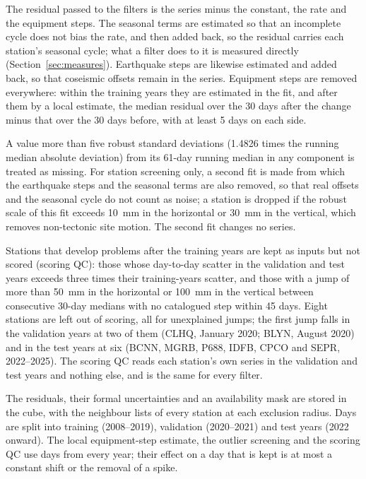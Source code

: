 \documentclass[preprint,12pt,authoryear]{elsarticle}
\begin{document}
The residual passed to the filters is the series minus the constant, the rate and the equipment steps. The seasonal terms are estimated so that an incomplete cycle does not bias the rate, and then added back, so the residual carries each station's seasonal cycle; what a filter does to it is measured directly (Section~\ref{sec:measures}). Earthquake steps are likewise estimated and added back, so that coseismic offsets remain in the series. Equipment steps are removed everywhere: within the training years they are estimated in the fit, and after them by a local estimate, the median residual over the 30 days after the change minus that over the 30 days before, with at least 5 days on each side.

A value more than five robust standard deviations (1.4826 times the running median absolute deviation) from its 61-day running median in any component is treated as missing. For station screening only, a second fit is made from which the earthquake steps and the seasonal terms are also removed, so that real offsets and the seasonal cycle do not count as noise; a station is dropped if the robust scale of this fit exceeds 10~mm in the horizontal or 30~mm in the vertical, which removes non-tectonic site motion. The second fit changes no series.

Stations that develop problems after the training years are kept as inputs but not scored (scoring QC): those whose day-to-day scatter in the validation and test years exceeds three times their training-years scatter, and those with a jump of more than 50~mm in the horizontal or 100~mm in the vertical between consecutive 30-day medians with no catalogued step within 45 days. Eight stations are left out of scoring, all for unexplained jumps; the first jump falls in the validation years at two of them (CLHQ, January 2020; BLYN, August 2020) and in the test years at six (BCNN, MGRB, P688, IDFB, CPCO and SEPR, 2022--2025). The scoring QC reads each station's own series in the validation and test years and nothing else, and is the same for every filter.

The residuals, their formal uncertainties and an availability mask are stored in the cube, with the neighbour lists of every station at each exclusion radius. Days are split into training (2008--2019), validation (2020--2021) and test years (2022 onward). The local equipment-step estimate, the outlier screening and the scoring QC use days from every year; their effect on a day that is kept is at most a constant shift or the removal of a spike.
\end{document}
